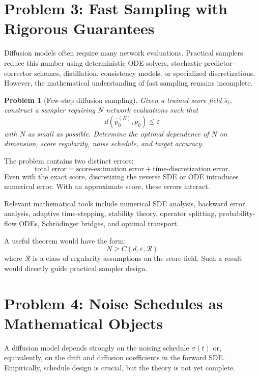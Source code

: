 \documentclass[11pt]{article}
\newtheorem{problem}{Problem}
\begin{document}
\section{Problem 3: Fast Sampling with Rigorous Guarantees}

Diffusion models often require many network evaluations. Practical samplers reduce this number using deterministic ODE solvers, stochastic predictor-corrector schemes, distillation, consistency models, or specialized discretizations. However, the mathematical understanding of fast sampling remains incomplete.

\begin{problem}[Few-step diffusion sampling]
Given a trained score field $\widehat{s}_t$, construct a sampler requiring $N$ network evaluations such that
\begin{equation}
d(\widehat{p}_0^{(N)},p_0) \leq \varepsilon
\end{equation}
with $N$ as small as possible. Determine the optimal dependence of $N$ on dimension, score regularity, noise schedule, and target accuracy.
\end{problem}

The problem contains two distinct errors:
\begin{equation}
\text{total error}
=
\text{score-estimation error}
+
\text{time-discretization error}.
\end{equation}
Even with the exact score, discretizing the reverse SDE or ODE introduces numerical error. With an approximate score, these errors interact.

Relevant mathematical tools include numerical SDE analysis, backward error analysis, adaptive time-stepping, stability theory, operator splitting, probability-flow ODEs, Schr\"{o}dinger bridges, and optimal transport.

A useful theorem would have the form:
\begin{equation}
N \geq C(d,\varepsilon,\mathcal{R})
\end{equation}
where $\mathcal{R}$ is a class of regularity assumptions on the score field. Such a result would directly guide practical sampler design.

\section{Problem 4: Noise Schedules as Mathematical Objects}

A diffusion model depends strongly on the noising schedule $\sigma(t)$ or, equivalently, on the drift and diffusion coefficients in the forward SDE. Empirically, schedule design is crucial, but the theory is not yet complete.
\end{document}
